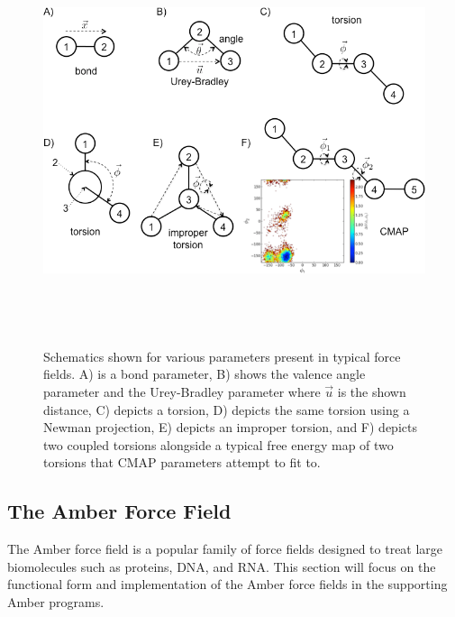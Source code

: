 \begin{figure}
   \includegraphics[width=6.5in,height=4.7in]{Parameters.png}
   \caption[Schematics shown for various parameters present in typical force
            fields.]
           {Schematics shown for various parameters present in typical force
            fields. A) is a bond parameter, B) shows the valence angle parameter
            and the Urey-Bradley parameter where $\vec{u}$ is the shown
            distance, C) depicts a torsion, D) depicts the same torsion using a
            Newman projection, E) depicts an improper torsion, and F) depicts
            two coupled torsions alongside a typical free energy map of two
            torsions that CMAP parameters attempt to fit to.}
   \label{fig1:Parameters}
\end{figure}

\subsection{The Amber Force Field}

The Amber force field is a popular family of force fields designed to treat
large biomolecules such as proteins, DNA, and RNA. This section will focus on
the functional form and implementation of the Amber force fields
\cite{Cornell_JAmChemSoc_1995_v117_p5179, Duan03, Hornak_Proteins_2006_v65_p712}
in the supporting Amber programs. \cite{Case_JComputChem_2005_v26_p1668}

